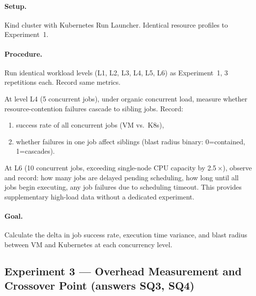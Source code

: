 \paragraph{Setup.} Kind cluster with Kubernetes Run Launcher. Identical resource profiles to Experiment~1.

\paragraph{Procedure.}

\begin{description}[style=nextline]
  \item[Part A --- Isolation comparison]
  Run identical workload levels (L1, L2, L3, L4, L5, L6) as Experiment~1, 3 repetitions each. Record same metrics.

  \item[Part B --- Blast radius test (folded in)]
  At level L4 (5 concurrent jobs), under organic concurrent load, measure whether resource-contention failures cascade to sibling jobs. Record:
  \begin{enumerate}[label=(\alph*)]
    \item success rate of all concurrent jobs (VM vs.\ K8s),
    \item whether failures in one job affect siblings (blast radius binary: 0=contained, 1=cascades).
  \end{enumerate}

  \item[Part C --- Spike observation (folded in)]
  At L6 (10 concurrent jobs, exceeding single-node CPU capacity by 2.5\,$\times$), observe and record: how many jobs are delayed pending scheduling, how long until all jobs begin executing, any job failures due to scheduling timeout. This provides supplementary high-load data without a dedicated experiment.
\end{description}

\paragraph{Goal.} Calculate the delta in job success rate, execution time variance, and blast radius between VM and Kubernetes at each concurrency level.

\subsection{Experiment 3 --- Overhead Measurement and Crossover Point (answers SQ3, SQ4)}
\label{subsec:exp3}

